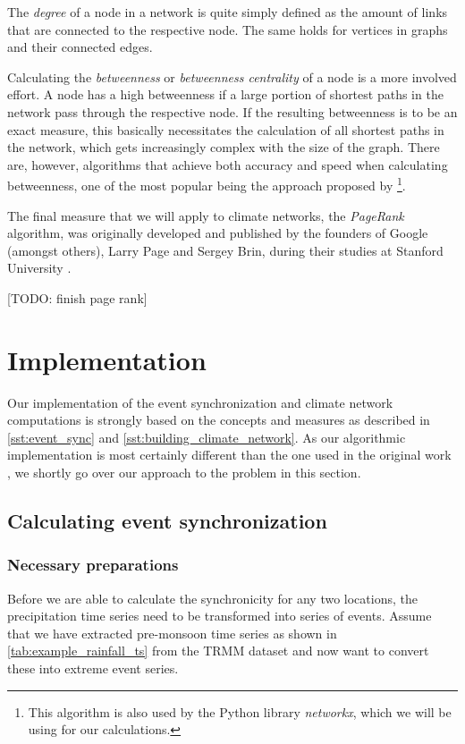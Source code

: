 The \textit{degree} of a node in a network is quite simply defined as the amount of links that are connected to the respective node. The same holds for vertices in graphs and their connected edges.

Calculating the \textit{betweenness} or \textit{betweenness centrality} of a node is a more involved effort. A node has a high betweenness if a large portion of shortest paths in the network pass through the respective node. If the resulting betweenness is to be an exact measure, this basically necessitates the calculation of all shortest paths in the network, which gets increasingly complex with the size of the graph. There are, however, algorithms that achieve both accuracy and speed when calculating betweenness, one of the most popular being the approach proposed by \citet{Brandes.2001}\footnote{This algorithm is also used by the Python library \textit{networkx}, which we will be using for our calculations.}.

The final measure that we will apply to climate networks, the \textit{PageRank} algorithm, was originally developed and published by the founders of Google (amongst others), Larry Page and Sergey Brin, during their studies at Stanford University \citep{Page.1999}.

[TODO: finish page rank]

\section{Implementation}
\label{st:event_sync_implementation}
Our implementation of the event synchronization and climate network computations is strongly based on the concepts and measures as described in \cref{sst:event_sync} and \cref{sst:building_climate_network}. As our algorithmic implementation is most certainly different than the one used in the original work \citep{Stolbova.2015}, we shortly go over our approach to the problem in this section.

\subsection{Calculating event synchronization}
\label{sst:event_sync_calculation}

\subsubsection{Necessary preparations}
Before we are able to calculate the synchronicity for any two locations, the precipitation time series need to be transformed into series of events. Assume that we have extracted pre-monsoon time series as shown in \cref{tab:example_rainfall_ts} from the TRMM dataset and now want to convert these into extreme event series.

